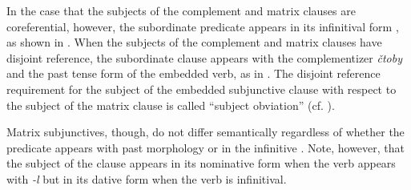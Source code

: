\documentclass[output=paper,
modfonts,
newtxmath,
hidelinks,
]{langscibook}
\begin{document}
\noindent In the case that the subjects of the complement and matrix clauses are coreferential, however, the subordinate predicate appears in its infinitival form \citep[160, 236]{Cubberley2002}, as shown in . When the subjects of the complement and matrix clauses have disjoint reference, the subordinate clause appears with the complementizer \textit{čtoby} and the past tense form of the embedded verb, as in . The disjoint reference requirement for the subject of the embedded subjunctive clause with respect to the subject of the matrix clause is called “subject obviation” (cf. \citealt[1]{Antonenko2010}).

\ea \label{10:ex16}
	\z
\z

\ea \label{10:ex17}
	\z
\z

\noindent Matrix subjunctives, though, do not differ semantically regardless of whether the predicate appears with past morphology or in the infinitive \citep[10]{Asarina2006}. Note, however, that the subject of the clause appears in its nominative form when the verb appears with \textit{{}-l} but in its dative form when the verb is infinitival.
\end{document}
